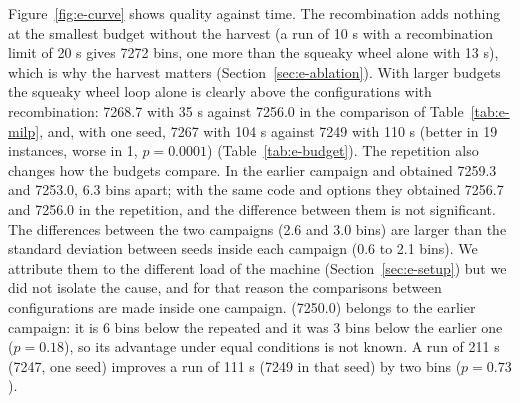 Figure~\ref{fig:e-curve} shows quality against time. The recombination adds nothing at the smallest budget
without the harvest (a run of 10 s with a recombination limit of 20 s gives 7272 bins, one more than the squeaky wheel alone with 13 s),
which is why the harvest matters (Section~\ref{sec:e-ablation}). With larger budgets the squeaky wheel loop alone is clearly above the configurations with recombination:
7268.7 with 35 s against 7256.0 in the comparison of Table~\ref{tab:e-milp}, and, with one seed, 7267 with 104 s against 7249 with 110 s
(better in 19 instances, worse in 1, $p=0.0001$) (Table~\ref{tab:e-budget}).
The repetition also changes how the budgets compare. In the earlier campaign \cfgfast{} and \cfgbal{} obtained 7259.3 and 7253.0, 6.3 bins apart; with the same code and options they obtained
7256.7 and 7256.0 in the repetition, and the difference between them is not significant. The differences between the two campaigns (2.6 and 3.0 bins) are larger than the standard deviation between seeds
inside each campaign (0.6 to 2.1 bins). We attribute them to the different load of the machine (Section~\ref{sec:e-setup}) but we did not isolate the cause, and for that reason the comparisons
between configurations are made inside one campaign. \cfgqual{} (7250.0) belongs to the earlier campaign: it is 6 bins below the repeated \cfgbal{} and it was 3 bins below the earlier one ($p=0.18$),
so its advantage under equal conditions is not known. A run of 211 s (7247, one seed) improves a run of 111 s (7249 in that seed) by two bins ($p=0.73$).

